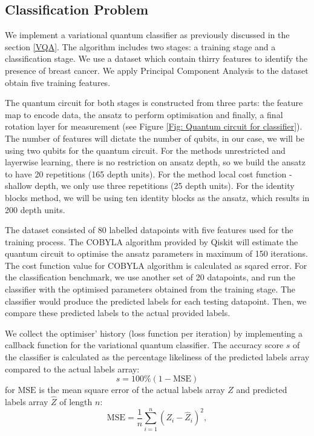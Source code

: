 \subsection{Classification Problem} \label{Sec: Classification Problem}
We implement a variational quantum classifier as previously discussed in the section \ref{VQA}.
The algorithm includes two stages: a training stage and a classification stage.
We use a dataset which contain thirry features to identify the presence of breast cancer.
We apply Principal Component Analysis to the dataset obtain five training features.

The quantum circuit for both stages is constructed from three parts: the feature map to encode data, the ansatz to perform optimisation and finally, a final rotation layer for measurement (see Figure \ref{Fig: Quantum circuit for classifier}).
The number of features will dictate the number of qubits, in our case, we will be using two qubits for the quantum circuit.
For the methods unrestricted and layerwise learning, there is no restriction on ansatz depth, so we build the ansatz to have 20 repetitions (165 depth units).
For the method local cost function - shallow depth, we only use three repetitions (25 depth units).
For the identity blocks method, we will be using ten identity blocks as the ansatz, which results in 200 depth units.

The dataset consisted of 80 labelled datapoints with five features used for the training process.
The COBYLA algorithm provided by Qiskit will estimate the quantum circuit to optimise the ansatz parameters in maximum of 150 iterations.
The cost function value for COBYLA algorithm is calculated as sqared error.
For the classification benchmark, we use another set of 20 datapoints, and run the classifier with the optimised parameters obtained from the training stage.
The classifier would produce the predicted labels for each testing datapoint.
Then, we compare these predicted labels to the actual provided labels.

We collect the optimiser' history (loss function per iteration) by implementing a callback function for the variational quantum classifier.
The accuracy score $s$ of the classifier is calculated as the percentage likeliness of the predicted labels array compared to the actual labels array:
\begin{equation}
    s = 100\% (1 - \text{MSE})
\end{equation}
for $\text{MSE}$ is the mean square error of the actual labels array $Z$ and predicted labels array $\hat{Z}$ of length $n$:
\begin{equation}
    \text{MSE} = \frac{1}{n}\sum^n_{i=1}(Z_i - \hat{Z}_i)^2,
\end{equation}



